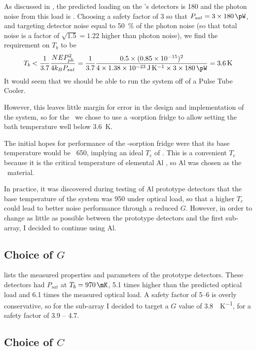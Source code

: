 As discussed in , the predicted loading on the \Imager's detectors is \SI{180}{\pW} and the photon noise from this load is .
Choosing a safety factor of 3 so that $P_{sat} = 3 \times \SI{180}{\pW}$, and targeting detector noise equal to \SI{50}{\percent} of the photon noise (so that total noise is a factor of $\sqrt{1.5} = 1.22$ higher than photon noise), we find the requirement on $T_b$ to be
\begin{equation}
  T_b < \frac{1}{3.7} \frac{\NEPph^2}{4 k_B P_{sat}} =
        \frac{1}{3.7} \frac{0.5 \times (\num{0.85e-15})^2}{4 \times \SI{1.38e-23}{\J\per\K} \times 3 \times \SI{180}{\pW}} = 
        \SI{3.6}{\K}
\end{equation}
It would seem that we should be able to run the system off of a Pulse Tube Cooler.

However, this leaves little margin for error in the design and implementation of the system, so for the \Imager\ we chose to use a -sorption fridge to allow setting the bath temperature well below \SI{3.6}{\K}.

The initial hopes for performance of the -sorption fridge were that its base temperature would be ~\SI{650}{\mK}, implying an ideal $T_c$ of .
This is a convenient $T_c$ because it is the critical temperature of elemental Al \cite{matthias_superconductivity_1963}, so Al was chosen as the \TES\ material.

In practice, it was discovered during testing of Al prototype detectors that the base temperature of the system was \SI{950}{\mK} under optical load, so that a higher $T_c$ could lead to better noise performance through a reduced $G$.
However, in order to change as little as possible between the prototype detectors and the first sub-array, I decided to continue using Al.

\subsection{Choice of $G$}

 lists the measured properties and parameters of the prototype detectors.
These detectors had $P_{sat}$ at $T_b = \SI{970}{\mK}$, 5.1 times higher than the predicted optical load and 6.1 times the measured optical load.
A safety factor of 5--6 is overly conservative, so for the sub-array I decided to target a $G$ value of \SI{3.8}{\nW\per\K}, for a safety factor of 3.9 -- 4.7.

\subsection{Choice of $C$}

